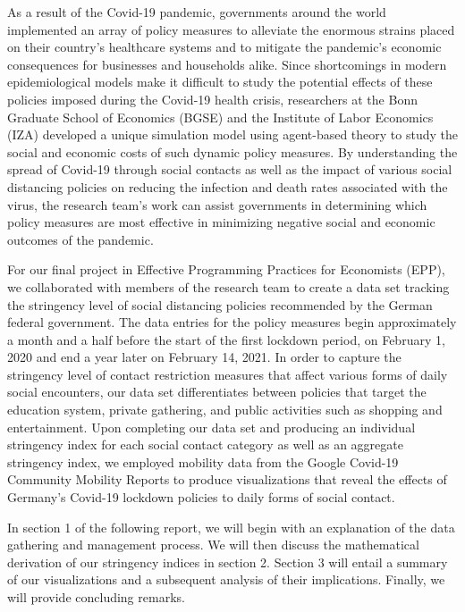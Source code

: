 As a result of the Covid-19 pandemic, governments around the world implemented an array of policy measures to alleviate the enormous strains placed on their country’s healthcare systems and to mitigate the pandemic’s economic consequences for businesses and households alike. Since shortcomings in modern epidemiological models make it difficult to study the potential effects of these policies imposed during the Covid-19 health crisis, researchers at the Bonn Graduate School of Economics (BGSE) and the Institute of Labor Economics (IZA) developed a unique simulation model using agent-based theory to study the social and economic costs of such dynamic policy measures. By understanding the spread of Covid-19 through social contacts as well as the impact of various social distancing policies on reducing the infection and death rates associated with the virus, the research team’s work can assist governments in determining which policy measures are most effective in minimizing negative social and economic outcomes of the pandemic.

For our final project in Effective Programming Practices for Economists (EPP), we collaborated with members of the research team to create a data set tracking the stringency level of social distancing policies recommended by the German federal government. The data entries for the policy measures begin approximately a month and a half before the start of the first lockdown period, on February 1, 2020 and end a year later on February 14, 2021. In order to capture the stringency level of contact restriction measures that affect various forms of daily social encounters, our data set differentiates between policies that target the education system, private gathering, and public activities such as shopping and entertainment. Upon completing our data set and producing an individual stringency index for each social contact category as well as an aggregate stringency index, we employed mobility data from the Google Covid-19 Community Mobility Reports to produce visualizations that reveal the effects of Germany’s Covid-19 lockdown policies to daily forms of social contact.

In section 1 of the following report, we will begin with an explanation of the data gathering and management process. We will then discuss the mathematical derivation of our stringency indices in section 2. Section 3 will entail a summary of our visualizations and a subsequent analysis of their implications. Finally, we will provide concluding remarks.